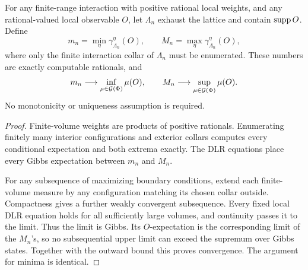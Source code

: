 \begin{remark}\label{lem:extrema}
For any finite-range interaction with positive rational local weights, and any rational-valued local observable \(O\), let \(\Lambda_n\) exhaust the lattice and contain \(\operatorname{supp} O\). Define
\begin{equation}
 m_n=\min_\eta\gamma_{\Lambda_n}^{\eta}(O),
 \qquad
 M_n=\max_\eta\gamma_{\Lambda_n}^{\eta}(O),
\end{equation}
where only the finite interaction collar of \(\Lambda_n\) must be enumerated. These numbers are exactly computable rationals, and
\begin{equation}
 m_n\longrightarrow\inf_{\mu\in\mathcal G(\Phi)}\mu(O),\qquad
 M_n\longrightarrow\sup_{\mu\in\mathcal G(\Phi)}\mu(O).
\end{equation}
No monotonicity or uniqueness assumption is required.
\end{remark}
\begin{proof}
Finite-volume weights are products of positive rationals. Enumerating finitely many interior configurations and exterior collars computes every conditional expectation and both extrema exactly. The DLR equations place every Gibbs expectation between \(m_n\) and \(M_n\).

For any subsequence of maximizing boundary conditions, extend each finite-volume measure by any configuration matching its chosen collar outside. Compactness gives a further weakly convergent subsequence. Every fixed local DLR equation holds for all sufficiently large volumes, and continuity passes it to the limit. Thus the limit is Gibbs. Its \(O\)-expectation is the corresponding limit of the \(M_n\)'s, so no subsequential upper limit can exceed the supremum over Gibbs states. Together with the outward bound this proves convergence. The argument for minima is identical.
\end{proof}

